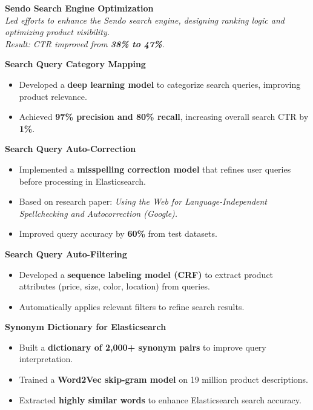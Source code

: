 \documentclass[10pt, letterpaper]{article}
\newenvironment{zitemize}{
\begin{itemize} \itemsep 0pt \parskip 0pt \parsep 1pt}
{\end{itemize}\vspace{-.5em}}
\begin{document}
\textbf{\small{Sendo Search Engine Optimization}} \\
\textit{Led efforts to enhance the Sendo search engine, designing ranking logic and optimizing product visibility. \\ 
Result: CTR improved from \textbf{38\% to 47\%}.}

\textbf{\small{Search Query Category Mapping}}
\begin{zitemize}
    \vspace{-1mm}\item \small{Developed a \textbf{deep learning model} to categorize search queries, improving product relevance.}
    \item \small{Achieved \textbf{97\% precision and 80\% recall}, increasing overall search CTR by \textbf{1\%}.}
\end{zitemize}

\textbf{\small{Search Query Auto-Correction}}
\begin{zitemize}
    \vspace{-1mm}\item \small{Implemented a \textbf{misspelling correction model} that refines user queries before processing in Elasticsearch.}
    \item \small{Based on research paper: \textit{Using the Web for Language-Independent Spellchecking and Autocorrection (Google).}}
    \item \small{Improved query accuracy by \textbf{60\%} from test datasets.}
\end{zitemize}

\textbf{\small{Search Query Auto-Filtering}}
\begin{zitemize}
    \vspace{-1mm}\item \small{Developed a \textbf{sequence labeling model (CRF)} to extract product attributes (price, size, color, location) from queries.}
    \item \small{Automatically applies relevant filters to refine search results.}
\end{zitemize}

\textbf{\small{Synonym Dictionary for Elasticsearch}}
\begin{zitemize}
    \vspace{-1mm}\item \small{Built a \textbf{dictionary of 2,000+ synonym pairs} to improve query interpretation.}
    \item \small{Trained a \textbf{Word2Vec skip-gram model} on 19 million product descriptions.}
    \item \small{Extracted \textbf{highly similar words} to enhance Elasticsearch search accuracy.}
\end{zitemize}
\end{document}
